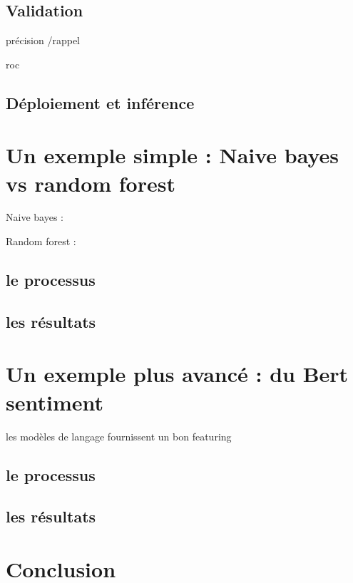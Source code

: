 \documentclass[
  letterpaper,
  DIV=11,
  numbers=noendperiod]{scrreprt}
\begin{document}
\subsection{Validation}\label{validation}

précision /rappel

roc

\subsection{Déploiement et
inférence}\label{duxe9ploiement-et-infuxe9rence}

\section{Un exemple simple : Naive bayes vs random
forest}\label{un-exemple-simple-naive-bayes-vs-random-forest}

Naive bayes :

Random forest :

\subsection{le processus}\label{le-processus}

\subsection{les résultats}\label{les-ruxe9sultats}

\section{Un exemple plus avancé : du Bert
sentiment}\label{un-exemple-plus-avancuxe9-du-bert-sentiment}

les modèles de langage fournissent un bon featuring

\subsection{le processus}\label{le-processus-1}

\subsection{les résultats}\label{les-ruxe9sultats-1}

\section{Conclusion}\label{conclusion-11}
\end{document}
